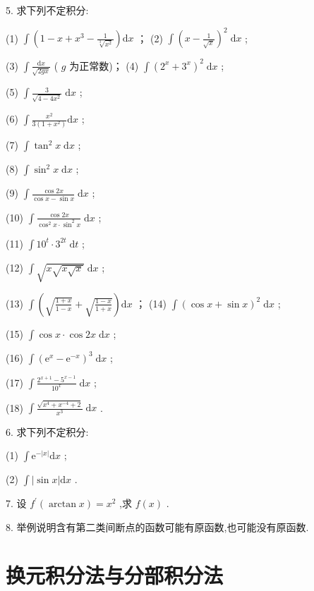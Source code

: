 5. 求下列不定积分:

(1) \(\int \left( {1 - x + {x}^{3} - \frac{1}{\sqrt[3]{{x}^{2}}}}\right) \mathrm{d}x\) ； (2) \(\int {\left( x - \frac{1}{\sqrt{x}}\right) }^{2}\mathrm{\;d}x\) ;

(3) \(\int \frac{\mathrm{d}x}{\sqrt{2gx}}\) ( \(g\) 为正常数)； (4) \(\int {\left( {2}^{x} + {3}^{x}\right) }^{2}\mathrm{\;d}x\) ;

(5) \(\int \frac{3}{\sqrt{4 - 4{x}^{2}}}\mathrm{\;d}x\) ;

(6) \(\int \frac{{x}^{2}}{3\left( {1 + {x}^{2}}\right) }\mathrm{d}x\) ;

(7) \(\int {\tan }^{2}x\mathrm{\;d}x\) ;

(8) \(\int {\sin }^{2}x\mathrm{\;d}x\) ;

(9) \(\int \frac{\cos {2x}}{\cos x - \sin x}\mathrm{\;d}x\) ;

(10) \(\int \frac{\cos {2x}}{{\cos }^{2}x \cdot  {\sin }^{2}x}\mathrm{\;d}x\) ;

(11) \(\int {10}^{t} \cdot  {3}^{2t}\mathrm{\;d}t\) ;

(12) \(\int \sqrt{x\sqrt{x\sqrt{x}}}\mathrm{\;d}x\) ;

(13) \(\int \left( {\sqrt{\frac{1 + x}{1 - x}} + \sqrt{\frac{1 - x}{1 + x}}}\right) \mathrm{d}x\) ； (14) \(\int {\left( \cos x + \sin x\right) }^{2}\mathrm{\;d}x\) ;

(15) \(\int \cos x \cdot  \cos {2x}\mathrm{\;d}x\) ;

(16) \(\int {\left( {\mathrm{e}}^{x} - {\mathrm{e}}^{-x}\right) }^{3}\mathrm{\;d}x\) ;

(17) \(\int \frac{{2}^{x + 1} - {5}^{x - 1}}{{10}^{x}}\mathrm{\;d}x\) ;

(18) \(\int \frac{\sqrt{{x}^{4} + {x}^{-4} + 2}}{{x}^{3}}\mathrm{\;d}x\) .

6. 求下列不定积分:

(1) \(\int {\mathrm{e}}^{-\left| x\right| }\mathrm{d}x\) ;

(2) \(\int \left| {\sin x}\right| \mathrm{d}x\) .

7. 设 \({f}^{\prime }\left( {\arctan x}\right)  = {x}^{2}\) ,求 \(f\left( x\right)\) .

8. 举例说明含有第二类间断点的函数可能有原函数,也可能没有原函数.

\section{换元积分法与分部积分法}

